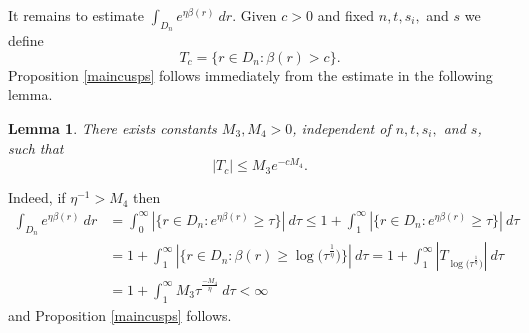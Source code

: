 \documentclass[10pt,reqno]{amsart}
\theoremstyle{Theorem}
\newtheorem{lemma}[theorem]{Lemma}
\theoremstyle{definition}
\theoremstyle{remark}
\newcommand{\inv}{^{-1}}
\begin{document}
It remains to estimate $\int_{D_n} e^{\eta \beta(r)} \ dr$.  Given $c>0$ and fixed  $n, t, s_i, $ and $s$  we define $$T_c  = \{  r \in D_n:\beta(r) > c\}.$$
Proposition \ref{maincusps}   follows immediately  from the estimate in the following lemma.
\begin{lemma}\label{Tc} %
There exists constants $M_3,M_4 >0$, independent of $n, t, s_i, $ and $s$,    such that
$$ |T_c| \leq M_3e^{-cM_4}.$$
\end{lemma}
Indeed, if $\eta\inv > { M_4}$ then
\begin{align*}\int_{D_n} e^{\eta \beta(r)} \ dr
&=\int_0^\infty |\{ r\in D_n: e^{\eta \beta(r) }\ge \tau\}|  \ d \tau
\le 1+ \int_1^\infty |\{ r\in D_n: e^{\eta \beta(r) }\ge \tau\}|  \ d \tau\\
&=1+ \int_1^\infty |\{ r\in D_n:   \beta(r) \ge \log\big(\tau^{\frac 1 \eta}\big)\}| \ d \tau
=1+\int_1^\infty | T_{\log\big(\tau^{\frac 1 \eta}\big)}| \ d \tau\\
&= 1 + \int_1^\infty M_3  \tau^{\frac { -M_4} \eta} \ d \tau <\infty
\end{align*}
 and Proposition \ref{maincusps} follows.
\end{document}
